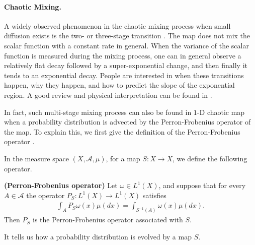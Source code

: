 \paragraph{Chaotic Mixing.}
A widely observed phenomenon in the chaotic mixing process when small diffusion exists is the
two- or three-stage transition \cite{Thiffeault2003-13, Fereday2002, Antonsen1996}. The map
does not mix the scalar function with a constant rate in general. When the variance of the scalar
function is measured during the mixing process, one can in general observe a relatively flat decay
followed by a super-exponential change, and then finally it tends to an exponential decay. People
are interested in when these transitions happen, why they happen, and how to predict the slope of
the exponential region. A good review and physical interpretation can be found in
\cite{Thiffeault2004}.

In fact, such multi-stage mixing process can also be found in $1$-D chaotic map when a probability distribution is advected by the Perron-Frobenius operator of the map. To explain this, we first give the definition of the Perron-Frobenius operator \cite{Mezic2005}.

In the measure space $(X,\mathcal{A},\mu)$, for a map $S:X\to X$, we define the following operator. 
\begin{definition} \textbf{ (Perron-Frobenius operator)}
Let $\omega \in L^1(X)$, and suppose that for every $A \in \mathcal{A}$ the operator $P_S:L^1(X) \to L^1(X)$ satisfies
  \begin{eqnarray}
    \int_A P_S \omega(x)\mu(dx) = \int_{S^{-1}(A)} \omega(x)\mu(dx).
  \end{eqnarray}
Then $P_S$ is the Perron-Frobenius operator associated with $S$.
\end{definition}
It tells us how a probability distribution is evolved by a map $S$. 

